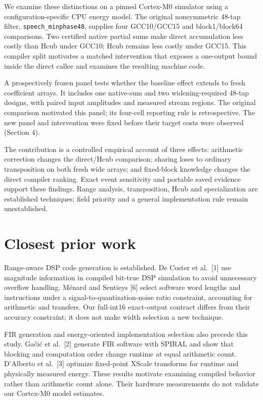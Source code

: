\documentclass[conference]{IEEEtran}
\begin{document}
We examine these distinctions on a pinned Cortex-M0 simulator using a
configuration-specific CPU energy model. The original nonsymmetric
48-tap filter, \texttt{speech\_minphase48}, supplies four GCC10/GCC15
and block1/block64 comparisons. Two certified native partial sums make
direct accumulation less costly than Hcub under GCC10; Hcub remains less
costly under GCC15. This compiler split motivates a matched intervention
that exposes a one-output bound inside the direct callee and examines
the resulting machine code.

A prospectively frozen panel tests whether the baseline effect extends
to fresh coefficient arrays. It includes one native-sum and two
widening-required 48-tap designs, with paired input amplitudes and
measured stream regions. The original comparison motivated this panel;
its four-cell reporting rule is retrospective. The new panel and
intervention were fixed before their target costs were observed (Section
4).

The contribution is a controlled empirical account of three effects:
arithmetic correction changes the direct/Hcub comparison; sharing loses
to ordinary transposition on both fresh wide arrays; and fixed-block
knowledge changes the direct compiler ranking. Exact event sensitivity
and portable saved evidence support these findings. Range analysis,
transposition, Hcub and specialization are established techniques; field
priority and a general implementation rule remain unestablished.

\section{Closest prior work}\label{closest-prior-work}

Range-aware DSP code generation is established. De Coster et al.~{[}1{]}
use magnitude information in compiled bit-true DSP simulation to avoid
unnecessary overflow handling. Ménard and Sentieys {[}6{]} select
software word lengths and instructions under a
signal-to-quantization-noise ratio constraint, accounting for arithmetic
and transfers. Our full-int16 exact-output contract differs from their
accuracy constraint; it does not make width selection a new technique.

FIR generation and energy-oriented implementation selection also precede
this study. Gačić et al.~{[}2{]} generate FIR software with SPIRAL and
show that blocking and computation order change runtime at equal
arithmetic count. D'Alberto et al.~{[}3{]} optimize fixed-point XScale
transforms for runtime and physically measured energy. These results
motivate examining compiled behavior rather than arithmetic count alone.
Their hardware measurements do not validate our Cortex-M0 model
estimates.
\end{document}
